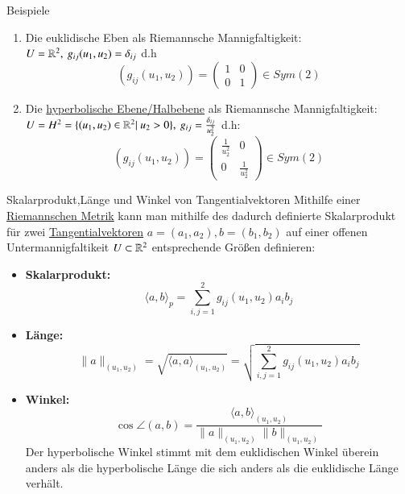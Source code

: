 \begin{titleDef}{Beispiele}
\begin{enumerate}[label=(\arabic*)]
	\item Die euklidische Eben als Riemannsche Mannigfaltigkeit:\\
	$U=\mathbb{R}^2,\: g_{ij}(u_1,u_2)=\delta_{ij}$ d.h
	$$(g_{ij}(u_1,u_2))=\begin{pmatrix}
		1&0\\0&1
	\end{pmatrix}\in Sym(2)$$
	\item Die \hyperref[hyperbolischpoincare]{hyperbolische Ebene/Halbebene} als Riemannsche Mannigfaltigkeit:\\
	$U=H^2=\{(u_1,u_2)\in\mathbb{R}^2|\ u_2>0\},\: g_{ij}=\frac{\delta_{ij}}{u_2^2}$ d.h:
	$$(g_{ij}(u_1,u_2))=\begin{pmatrix}
	\frac{1}{u_2^2}&0\\0&\frac{1}{u_2^2}
	\end{pmatrix}\in Sym(2)$$
\end{enumerate}
\end{titleDef}

\begin{titleDef}{Skalarprodukt,Länge und Winkel von Tangentialvektoren}
\label{kennwerteRiemann}
Mithilfe einer \hyperref[riemannMetrik]{Riemannschen Metrik} kann man mithilfe des dadurch definierte Skalarprodukt für zwei \hyperref[tangentialvektor]{Tangentialvektoren} $a=(a_1,a_2),b=(b_1,b_2)$ auf einer offenen Untermannigfaltikeit $U\subset\mathbb{R}^2$ entsprechende Größen definieren:
\begin{itemize}
	\item \textbf{Skalarprodukt:} $$\langle a,b\rangle_p=\sum_{i,j=1}^{2}g_{ij}(u_1,u_2)a_ib_j$$
	\item \textbf{Länge:} $$\lVert a\rVert_{(u_1,u_2)}=\sqrt{\langle a,a\rangle_{(u_1,u_2)}}=\sqrt{\sum\limits_{i,j=1}^{2}g_{ij}(u_1,u_2)a_ib_j}$$
	\item \textbf{Winkel:} $$\cos\angle(a,b)=\dfrac{\langle a,b\rangle_{(u_1,u_2)}}{\lVert a\rVert_{(u_1,u_2)}\lVert b\rVert_{(u_1,u_2)}}$$
	Der hyperbolische Winkel stimmt mit dem euklidischen Winkel überein anders als die hyperbolische Länge die sich anders als die euklidische Länge verhält.
\end{itemize}
\end{titleDef}